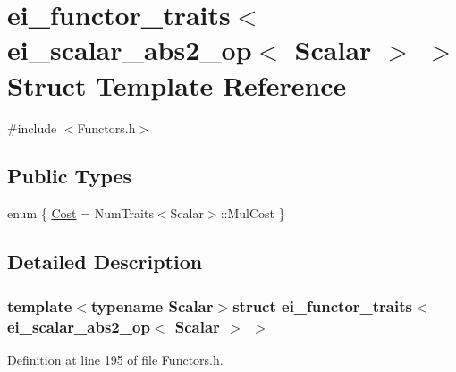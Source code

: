 \hypertarget{structei__functor__traits_3_01ei__scalar__abs2__op_3_01_scalar_01_4_01_4}{\section{ei\-\_\-functor\-\_\-traits$<$ ei\-\_\-scalar\-\_\-abs2\-\_\-op$<$ Scalar $>$ $>$ Struct Template Reference}
\label{structei__functor__traits_3_01ei__scalar__abs2__op_3_01_scalar_01_4_01_4}
}


{\ttfamily \#include $<$Functors.\-h$>$}

\subsection*{Public Types}
\begin{DoxyCompactItemize}
\item 
enum \{ \hyperlink{structei__functor__traits_3_01ei__scalar__abs2__op_3_01_scalar_01_4_01_4_ac1f6e9455b5e03edd0b24270bf73c72ba6d8951f42c5182aac572fa0c40dc3740}{Cost} = Num\-Traits$<$Scalar$>$\-:\-:Mul\-Cost
 \}
\end{DoxyCompactItemize}


\subsection{Detailed Description}
\subsubsection*{template$<$typename Scalar$>$struct ei\-\_\-functor\-\_\-traits$<$ ei\-\_\-scalar\-\_\-abs2\-\_\-op$<$ Scalar $>$ $>$}



Definition at line 195 of file Functors.\-h.



